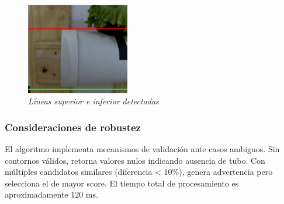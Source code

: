 \begin{figure}[H]
    \centering
    \includegraphics[width=0.4\textwidth]{imagenes/detector_tubos_6_lineas.png}
    \caption{\textit{Líneas superior e inferior detectadas}}
    \label{fig:detector_tubos_lineas}
\end{figure}

\subsubsection{Consideraciones de robustez}

El algoritmo implementa mecanismos de validación ante casos ambiguos. Sin contornos válidos, retorna valores nulos indicando ausencia de tubo. Con múltiples candidatos similares (diferencia < 10\%), genera advertencia pero selecciona el de mayor score. El tiempo total de procesamiento es aproximadamente 120 ms.
